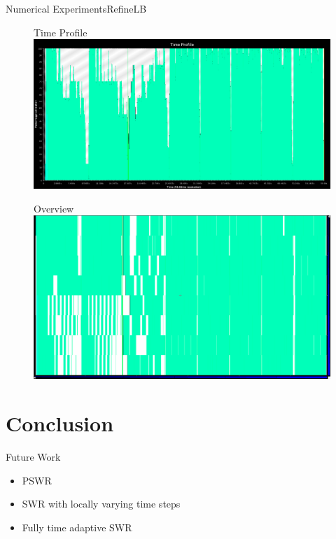 \documentclass[]{beamer}
\begin{document}
\begin{frame}{Numerical Experiments}{RefineLB}
  \begin{figure}{Time Profile}
    \includegraphics[width=.65\paperwidth,height=.35\paperheight]{figures/LoadBalancing/TimeProfileRefineLB}
  \end{figure}
  \begin{figure}{\hspace{15pt}Overview}
    \includegraphics[width=.65\paperwidth,height=.35\paperheight]{figures/LoadBalancing/OverviewRefineLB}
  \end{figure}
\end{frame}


\section{Conclusion}

\begin{frame}{Future Work}

  \begin{itemize}
  \item PSWR
  \item SWR with locally varying time steps
  \item Fully time adaptive SWR
  \end{itemize}

\end{frame}
\end{document}
